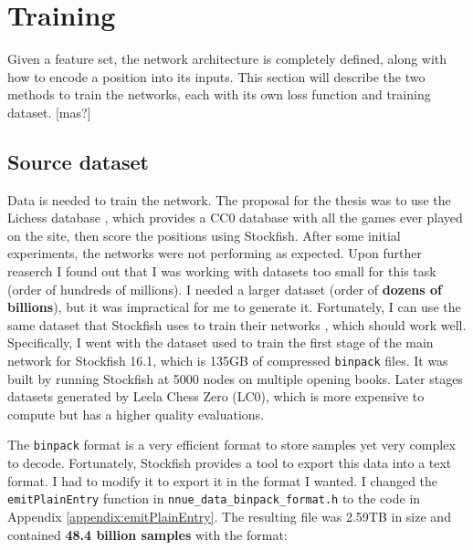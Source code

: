 \section{Training}


Given a feature set, the network architecture is completely defined, along with how to encode a position into its inputs. This section will describe the two methods to train the networks, each with its own loss function and training dataset.
[mas?]

\subsection{Source dataset}

Data is needed to train the network. The proposal for the thesis was to use the Lichess database \cite{lichessdb}, which provides a CC0 database with all the games ever played on the site, then score the positions using Stockfish. After some initial experiments, the networks were not performing as expected. Upon further reaserch I found out that I was working with datasets too small for this task (order of hundreds of millions). I needed a larger dataset (order of \textbf{dozens of billions}), but it was impractical for me to generate it. Fortunately, I can use the same dataset that Stockfish uses to train their networks \cite{sf_nnue_dataset}, which should work well. Specifically, I went with the dataset used to train the first stage of the main network for Stockfish 16.1, which is 135GB of compressed \texttt{binpack} files. It was built by running Stockfish at 5000 nodes on multiple opening books. Later stages datasets generated by Leela Chess Zero (LC0), which is more expensive to compute but has a higher quality evaluations.

The \texttt{binpack} format is a very efficient format to store samples yet very complex to decode. Fortunately, Stockfish provides a tool to export this data into a text format. I had to modify it to export it in the format I wanted. I changed the \texttt{emitPlainEntry} function in \texttt{nnue\_data\_binpack\_format.h} to the code in Appendix \ref{appendix:emitPlainEntry}. The resulting file was 2.59TB in size and contained \textbf{48.4 billion samples} with the format:

